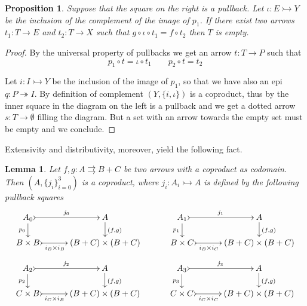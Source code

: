 \documentclass[a4paper,UKenglish,cleveref,pdftex,amsthm,thm-restate,numberwithinsect]{cas-sc}
\theoremstyle{plain}
\newtheorem{proposition}[theorem]{Proposition}
\newtheorem{lemma}[theorem]{Lemma}
\theoremstyle{definition}
\def\X{\textbf {\textup{X}}}
\newcommand{\mto}{\rightarrowtail}
\newcommand{\eto}{\twoheadrightarrow}
\begin{document}
\noindent 
\parbox{11.5cm}{\begin{proposition}\label{prop:isempty}
	Suppose that the square on the right is a pullback. Let $\iota \colon E\mto Y$ be the inclusion of the complement of the image of $p_1$. If there exist two  arrows $t_1\colon T\to E$ and $t_2\colon T\to X$ such that $g\circ \iota\circ t_1= f\circ t_2$ then $T$ is empty.
\end{proposition}}\hfill \parbox{2cm}{\vspace{-.5cm}}
\begin{proof}
	By the universal property of pullbacks we get an arrow $t\colon T\to P$ such that 
	\[p_1\circ t=\iota \circ t_1 \qquad p_2\circ t=t_2\]
	\parbox{2cm}{}\hfill \parbox{10.5cm}{Let $i\colon I\mto Y$ be the inclusion of the image of $p_1$, so that we have also an epi $q\colon P\eto I$. By definition of complement $(Y, \{i, \iota\})$ is a coproduct, thus by   the inner square in the diagram on the left is a pullback and we get a dotted arrow $s\colon T\to \emptyset$ filling the diagram. But a set with an arrow towards the empty set must be empty and we conclude. \qedhere }
\end{proof}


Extensivity and distributivity, moreover, yield the following fact.

\begin{lemma}\label{lem:nodim}
	Let $f,g\colon A\rightrightarrows B+C$ be two arrows with a coproduct as codomain. Then $(A, \{j_i\}_{i=0}^
	3)$ is a coproduct, where $j_i\colon A_i\mto A $ is defined by the following pullback squares
	\[\xymatrix@C=30pt@R=15pt{A_0 \ar@{>->}[r]^{j_0}  \ar[d]_{p_0}& A   \ar[d]^{(f,g)}& A_1 \ar@{>->}[r]^{j_1}  \ar[d]_{p_1} & A \ar[d]^{(f,g)} \\
		B\times B \ar@{>->}[r]_-{i_B\times i_B} & (B+C)\times (B+C) & B\times C \ar@{>->}[r]_-{i_B\times i_C} & (B+C)\times (B+C)}\]
	\[ \xymatrix@C=30pt@R=15pt{A_2 \ar@{>->}[r]^{j_2}  \ar[d]_{p_2}& A   \ar[d]^{(f,g)}& A_3 \ar@{>->}[r]^{j_3}  \ar[d]_{p_3} & A \ar[d]^{(f,g)} \\
		C\times B \ar@{>->}[r]_-{i_C\times i_B} & (B+C)\times (B+C) & C\times C \ar@{>->}[r]_-{i_C\times i_C} & (B+C)\times (B+C)}\]
\end{lemma}
\end{document}
